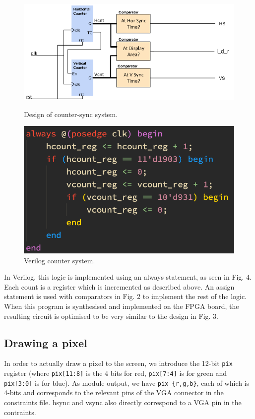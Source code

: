 \documentclass{ifda}
\begin{document}
\begin{figure}[h]
    \centering
    \begin{minipage}{0.55\textwidth}
        \centering
        \includegraphics[width=1\textwidth]{ circuit_sync }
        \caption{Design of counter-sync system.}
        \label{fig:sync_count}
    \end{minipage}\hfill
    \begin{minipage}{0.35\textwidth}
        \centering
        \includegraphics[width=1\textwidth]{ code1 }
        \caption{Verilog counter system.}
        \label{fig:code1}
    \end{minipage}
\end{figure}

In Verilog, this logic is implemented using an always statement, as seen in Fig. 4. Each count is a register which is incremented as described above. An assign statement is used with comparators in Fig. 2 to implement the rest of the logic. When this program is synthesised and implemented on the FPGA board, the resulting circuit is optimised to be very similar to the design in Fig. 3.\\

\subsection{Drawing a pixel}
In order to actually draw a pixel to the screen, we introduce the 12-bit \verb|pix| register (where \verb|pix[11:8]| is the 4 bits for red, \verb|pix[7:4]| is for green and \verb|pix[3:0]| is for blue). As module output, we have \verb|pix_{r,g,b}|, each of which is 4-bits and corresponds to the relevant pins of the VGA connector in the constraints file. hsync and vsync also directly correspond to a VGA pin in the contraints.\\
\end{document}
